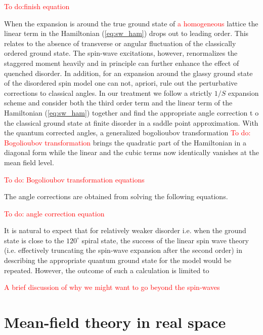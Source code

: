 \documentclass[aps,prb,twocolumn,showpacs]{revtex4-1}
\newcommand{\rcol}{\textcolor{red}}
\begin{document}
\rcol{To do:finish equation}

When the expansion is around the true ground state of \rcol{a homogeneous}
lattice the linear term in the Hamiltonian (\ref{eq:sw_ham}) drops out
to leading order\cite{Chernyshev-swt-triangular-2009}. This relates to
the absence of transverse or angular fluctuation of the classically ordered 
ground state. The spin-wave excitations, however, renormalizes 
the staggered moment heavily\cite{Jolicoeur-NN-triangular-1989} and in
principle can further enhance the effect of quenched disorder. In 
addition, for an expansion around the glassy ground state of the disordered 
spin model one can not, apriori, rule out the perturbative corrections
to classical angles.  In our treatment we follow a strictly $1/S$ expansion
scheme and consider both the third order term and the linear term of the 
Hamiltonian (\ref{eq:sw_ham}) together and find the appropriate angle correction t
o the classical ground state at finite disorder in a saddle point approximation. 
With the quantum corrected angles, a generalized bogolioubov transformation
\rcol{To do: Bogolioubov transformation} brings the quadratic part of the Hamiltonian 
in a diagonal form\cite{Wessel-quasicrystal-2005} while the linear and the cubic terms 
now identically vanishes at the mean field level.

\rcol{To do: Bogolioubov transformation equations}

The angle corrections are obtained from solving the following equations.

\rcol{To do: angle correction equation}

It is natural to expect that for relatively weaker disorder i.e. when the ground
state is close to the $120^\circ$ spiral state, the success of the linear spin
wave theory (i.e. effectively truncating the spin-wave expansion after the 
second order) in describing the appropriate quantum ground state for the 
model would be repeated. However, the outcome of such a calculation is limited
to 

\rcol{A brief discussion of why we might want to go beyond the spin-waves}

\section{Mean-field theory in real space}
\end{document}
